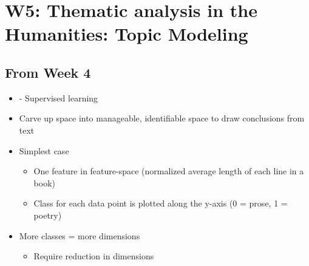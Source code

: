 \documentclass[a4paper]{article}
\begin{document}
\newpage
\section{W5: Thematic analysis in the Humanities: Topic Modeling}
\subsection{From Week 4}
\begin{itemize}
    \item - Supervised learning
    \item Carve up space into manageable, identifiable space to draw conclusions from text
    \item Simplest case
    \begin{itemize}[label=$\circ$]
        \item One feature in feature-space (normalized average length of each line in a book)
        \item Class for each data point is plotted along the y-axis (0 = prose, 1 = poetry)
  \end{itemize}
  \item More classes = more dimensions
  \begin{itemize}[label=$\circ$]
      \item Require reduction in dimensions
  \end{itemize}
\end{itemize}
\end{document}
